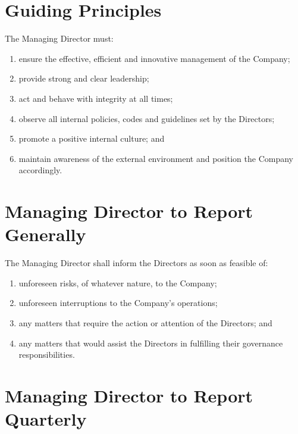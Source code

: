 \documentclass[a4paper,10pt]{article}
\renewcommand{\labelenumi}{(\arabic{enumi})}
\begin{document}
\section{Guiding Principles}

The Managing Director must:

\begin{enumerate}
    \renewcommand{\labelenumi}{(\alph{enumi})}
    \item ensure the effective, efficient and innovative management of the Company;
    \item provide strong and clear leadership;
    \item act and behave with integrity at all times;
    \item observe all internal policies, codes and guidelines set by the Directors;
    \item promote a positive internal culture; and
    \item maintain awareness of the external environment and position the Company accordingly.
\end{enumerate}

\section{Managing Director to Report Generally}

The Managing Director shall inform the Directors as soon as feasible of:

\begin{enumerate}
    \renewcommand{\labelenumi}{(\alph{enumi})}
    \item unforeseen risks, of whatever nature, to the Company;
    \item unforeseen interruptions to the Company's operations;
    \item any matters that require the action or attention of the Directors; and
    \item any matters that would assist the Directors in fulfilling their governance responsibilities.
\end{enumerate}

\section{Managing Director to Report Quarterly}
\end{document}
